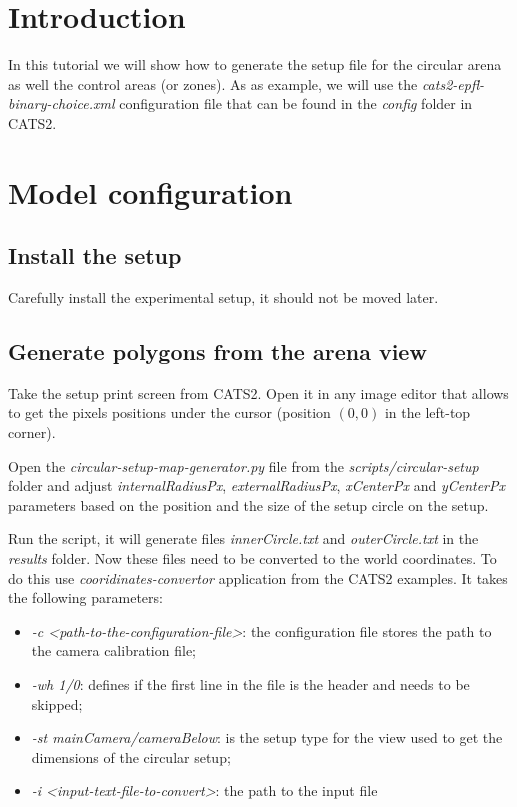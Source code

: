 \documentclass{styles/assisi}
\begin{document}

\lstset{
    language=xml,
    tabsize=3,
    xleftmargin=20pt,
    framexleftmargin=15pt,
    numbers=left,
    numberstyle=\tiny,
    numbersep=5pt,
    breaklines=true,
    showstringspaces=false,
    basicstyle=\footnotesize}

\chapter{Introduction}\label{chap:intro}
In this tutorial we will show how to generate the setup file for the circular arena as well the control areas (or zones). As as example, we will use the {\it cats2-epfl-binary-choice.xml} configuration file that can be found in the {\it config} folder in CATS2.

\chapter{Model configuration}\label{chap:intro}
\section{Install the setup}
Carefully install the experimental setup, it should not be moved later. 

\section{Generate polygons from the arena view}
Take the setup print screen from CATS2. Open it in any image editor that allows to get the pixels positions under the cursor (position $(0,0)$ in the left-top corner). 

Open the {\it circular-setup-map-generator.py} file from the {\it scripts/circular-setup} folder and adjust {\it internalRadiusPx}, {\it externalRadiusPx}, {\it xCenterPx} and {\it yCenterPx} parameters based on the position and the size of the setup circle on the setup. 

Run the script, it will generate files {\it innerCircle.txt} and {\it outerCircle.txt} in the {\it results} folder. Now these files need to be converted to the world coordinates. To do this use {\it cooridinates-convertor} application from the CATS2 examples. It takes the following parameters: 
\begin{itemize}
\item {\it -c  <path-to-the-configuration-file>}: the configuration file stores the path to the camera calibration file;
\item {\it -wh 1/0}: defines if the first line in the file is the header and needs to be skipped;
\item {\it -st mainCamera/cameraBelow}: is the setup type for the view used to get the dimensions of the circular setup;
\item {\it -i <input-text-file-to-convert>}: the path to the input file
\end{itemize}
\end{document}
